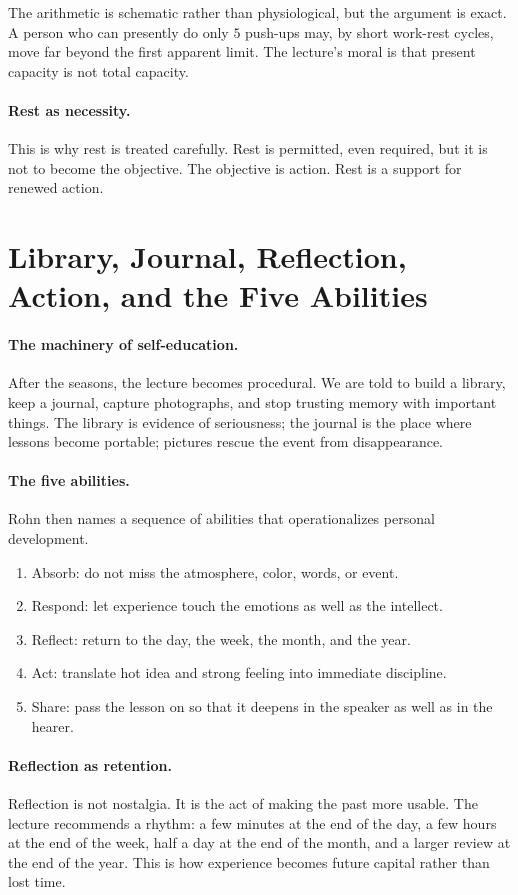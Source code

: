 The arithmetic is schematic rather than physiological, but the argument is exact. A person who can presently do only \(5\) push-ups may, by short work-rest cycles, move far beyond the first apparent limit. The lecture's moral is that present capacity is not total capacity.

\paragraph{Rest as necessity.}
This is why rest is treated carefully. Rest is permitted, even required, but it is not to become the objective. The objective is action. Rest is a support for renewed action.

\section{Library, Journal, Reflection, Action, and the Five Abilities}

\paragraph{The machinery of self-education.}
After the seasons, the lecture becomes procedural. We are told to build a library, keep a journal, capture photographs, and stop trusting memory with important things. The library is evidence of seriousness; the journal is the place where lessons become portable; pictures rescue the event from disappearance.

\paragraph{The five abilities.}
Rohn then names a sequence of abilities that operationalizes personal development.

\begin{enumerate}
\item Absorb: do not miss the atmosphere, color, words, or event.
\item Respond: let experience touch the emotions as well as the intellect.
\item Reflect: return to the day, the week, the month, and the year.
\item Act: translate hot idea and strong feeling into immediate discipline.
\item Share: pass the lesson on so that it deepens in the speaker as well as in the hearer.
\end{enumerate}

\paragraph{Reflection as retention.}
Reflection is not nostalgia. It is the act of making the past more usable. The lecture recommends a rhythm: a few minutes at the end of the day, a few hours at the end of the week, half a day at the end of the month, and a larger review at the end of the year. This is how experience becomes future capital rather than lost time.

